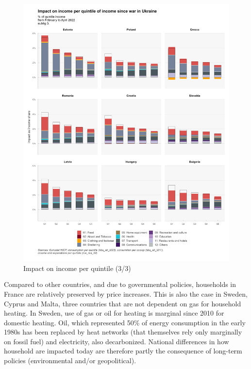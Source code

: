 \documentclass[
  9pt,
  a4paper,
  DIV=11,
  numbers=noendperiod,
  oneside]{scrartcl}
\begin{document}
\begin{figure}

\caption{Impact on income per quintile (3/3)}

{\centering \includegraphics[width=16cm,height=\textheight]{../svg/coicop_l1_wiu_3.png}

}

\end{figure}

\FloatBarrier

Compared to other countries, and due to governmental policies,
households in France are relatively preserved by price increases. This
is also the case in Sweden, Cyprus and Malta, three countries that are
not dependent on gas for household heating. In Sweden, use of gas or oil
for heating is marginal since 2010 for domestic heating. Oil, which
represented 50\% of energy consumption in the early 1980s has been
replaced by heat networks (that themselves rely only marginally on
fossil fuel)
and electricity, also decarbonized. National differences in how
household are impacted today are therefore partly the consequence of
long-term policies (environmental and/or geopolitical).
\end{document}
